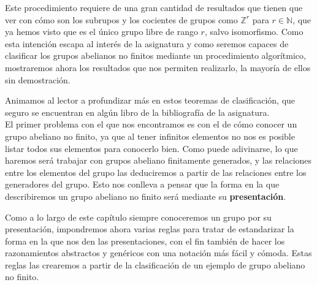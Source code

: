 \noindent
Este procedimiento requiere de una gran cantidad de resultados que tienen que ver con cómo son los subrupos y los cocientes de grupos como $\mathbb{Z}^r$ para $r\in \mathbb{N}$, que ya hemos visto que es el único grupo libre de rango $r$, salvo isomorfismo. Como esta intención escapa al interés de la asignatura y como seremos capaces de clasificar los grupos abelianos no finitos mediante un procedimiento algorítmico, mostraremos ahora los resultados que nos permiten realizarlo, la mayoría de ellos sin demostración. 

Animamos al lector a profundizar más en estos teoremas de clasificación, que seguro se encuentran en algún libro de la bibliografía de la asignatura.\\

\noindent
El primer problema con el que nos encontramos es con el de cómo conocer un grupo abeliano no finito, ya que al tener infinitos elementos no nos es posible listar todos sus elementos para conocerlo bien. Como puede adivinarse, lo que haremos será trabajar con grupos abeliano finitamente generados, y las relaciones entre los elementos del grupo las deduciremos a partir de las relaciones entre los generadores del grupo. Esto nos conlleva a pensar que la forma en la que describiremos un grupo abeliano no finito será mediante su \textbf{presentación}. 

Como a lo largo de este capítulo siempre conoceremos un grupo por su presentación, impondremos ahora varias reglas para tratar de estandarizar la forma en la que nos den las presentaciones, con el fin también de hacer los razonamientos abstractos y genéricos con una notación más fácil y cómoda. Estas reglas las crearemos a partir de la clasificación de un ejemplo de grupo abeliano no finito.

